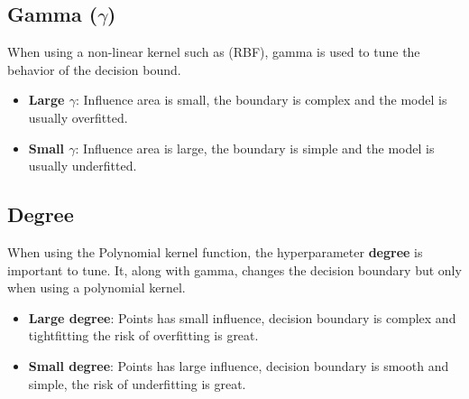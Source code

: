 \subsection{Gamma (\texorpdfstring{\(\gamma\)}{gamma})}
When using a non-linear kernel such as (RBF), gamma is used to tune the behavior of the decision bound.
\begin{itemize}
    \item \textbf{Large \(\gamma\)}: Influence area is small, the boundary is complex and the model is usually overfitted.
    \item \textbf{Small \(\gamma\)}: Influence area is large, the boundary is simple and the model is usually underfitted.
\end{itemize}

\subsection{Degree}
When using the Polynomial kernel function, the hyperparameter \textbf{degree} is important to tune. It, along with gamma, changes the decision boundary but only when using a polynomial kernel.
\begin{itemize}
    \item \textbf{Large degree}: Points has small influence, decision boundary is complex and tightfitting the risk of overfitting is great.
    \item \textbf{Small degree}: Points has large influence, decision boundary is smooth and simple, the risk of underfitting is great.
\end{itemize}
